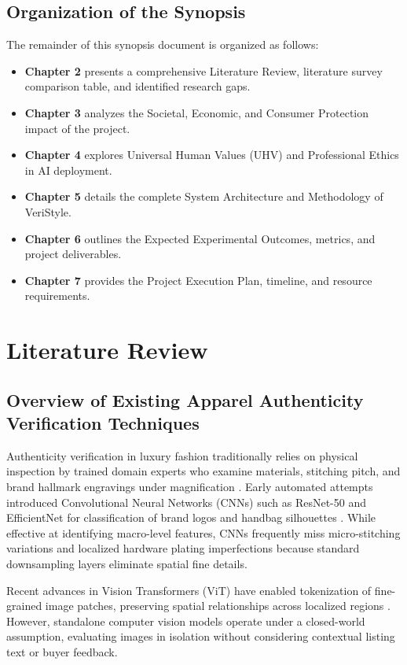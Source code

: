 \documentclass[a4paper,12pt]{report}
\begin{document}
\section{Organization of the Synopsis}
The remainder of this synopsis document is organized as follows:
\begin{itemize}
    \item \textbf{Chapter 2} presents a comprehensive Literature Review, literature survey comparison table, and identified research gaps.
    \item \textbf{Chapter 3} analyzes the Societal, Economic, and Consumer Protection impact of the project.
    \item \textbf{Chapter 4} explores Universal Human Values (UHV) and Professional Ethics in AI deployment.
    \item \textbf{Chapter 5} details the complete System Architecture and Methodology of VeriStyle.
    \item \textbf{Chapter 6} outlines the Expected Experimental Outcomes, metrics, and project deliverables.
    \item \textbf{Chapter 7} provides the Project Execution Plan, timeline, and resource requirements.
\end{itemize}

\newpage

\chapter{Literature Review}

\section{Overview of Existing Apparel Authenticity Verification Techniques}
Authenticity verification in luxury fashion traditionally relies on physical inspection by trained domain experts who examine materials, stitching pitch, and brand hallmark engravings under magnification \cite{smith2022computer}. Early automated attempts introduced Convolutional Neural Networks (CNNs) such as ResNet-50 and EfficientNet for classification of brand logos and handbag silhouettes \cite{patel2023deep}. While effective at identifying macro-level features, CNNs frequently miss micro-stitching variations and localized hardware plating imperfections because standard downsampling layers eliminate spatial fine details.

Recent advances in Vision Transformers (ViT) have enabled tokenization of fine-grained image patches, preserving spatial relationships across localized regions \cite{dosovitskiy2020image}. However, standalone computer vision models operate under a closed-world assumption, evaluating images in isolation without considering contextual listing text or buyer feedback.
\end{document}
